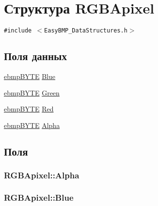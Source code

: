 \hypertarget{struct_r_g_b_apixel}{
\section{Структура RGBApixel}
\label{struct_r_g_b_apixel}
}
{\tt \#include $<$EasyBMP\_\-DataStructures.h$>$}

\subsection*{Поля данных}
\begin{CompactItemize}
\item 
\hyperlink{walsh__hadamard__run_2bmp_2_easy_b_m_p___data_structures_8h_05a8d0fee523be837bbfb6dcd147009f}{ebmpBYTE} \hyperlink{struct_r_g_b_apixel_f12bfb2ddd00995b59ef07e4e77c11af}{Blue}
\item 
\hyperlink{walsh__hadamard__run_2bmp_2_easy_b_m_p___data_structures_8h_05a8d0fee523be837bbfb6dcd147009f}{ebmpBYTE} \hyperlink{struct_r_g_b_apixel_9a9cd569a585a627910620a7b13690e7}{Green}
\item 
\hyperlink{walsh__hadamard__run_2bmp_2_easy_b_m_p___data_structures_8h_05a8d0fee523be837bbfb6dcd147009f}{ebmpBYTE} \hyperlink{struct_r_g_b_apixel_0d2e09cc0a67fd3da76b17289146fc26}{Red}
\item 
\hyperlink{walsh__hadamard__run_2bmp_2_easy_b_m_p___data_structures_8h_05a8d0fee523be837bbfb6dcd147009f}{ebmpBYTE} \hyperlink{struct_r_g_b_apixel_531e2866b6daa3975738cdd37db6270c}{Alpha}
\end{CompactItemize}


\subsection{Поля}
\hypertarget{struct_r_g_b_apixel_531e2866b6daa3975738cdd37db6270c}{
\subsubsection[{Alpha}]{ {\bf RGBApixel::Alpha}}}
\label{struct_r_g_b_apixel_531e2866b6daa3975738cdd37db6270c}


\hypertarget{struct_r_g_b_apixel_f12bfb2ddd00995b59ef07e4e77c11af}{
\subsubsection[{Blue}]{ {\bf RGBApixel::Blue}}}
\label{struct_r_g_b_apixel_f12bfb2ddd00995b59ef07e4e77c11af}


